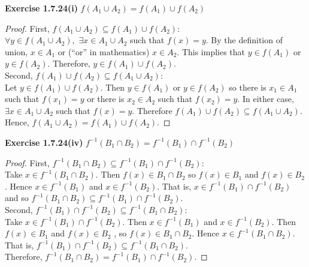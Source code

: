 \documentclass[12pt]{article}
\theoremstyle{definition}
\numberwithin{equation}{subsection}
\begin{document}
\textbf{Exercise 1.7.24(i)} \(f\left(A_{1} \cup A_{2}\right)=f\left(A_{1}\right) \cup f\left(A_{2}\right)\)
\begin{proof} First,
\(f\left(A_{1} \cup A_{2}\right) \subseteq f\left(A_{1}\right) \cup f\left(A_{2}\right)\):\\
\(\forall y \in f\left(A_{1} \cup A_{2}\right),\) \(\exists x \in A_{1} \cup A_{2}\)
such that \(f(x)=y .\) By the definition of union, \(x \in A_{1}\) or (``or'' in mathematics) \(x \in A_{2} .\) This implies that \(y \in f\left(A_{1}\right)\)
or \(y \in f\left(A_{2}\right) .\) Therefore, \(y \in f\left(A_{1}\right) \cup f\left(A_{2}\right) .\)\\
Second, \(f\left(A_{1}\right) \cup f\left(A_{2}\right) \subseteq f\left(A_{1} \cup A_{2}\right)\):\\
Let \(y \in f\left(A_{1}\right) \cup f\left(A_{2}\right) .\) Then \(y \in f\left(A_{1}\right)\) or \(y \in f\left(A_{2}\right)\) so there
is \(x_{1} \in A_{1}\) such that \(f\left(x_{1}\right)=y\) or there is \(x_{2} \in A_{2}\) such that \(f\left(x_{2}\right)=y .\) In either case, \(\exists x \in A_{1} \cup A_{2}\) such that \(f(x)=y .\) Therefore \(f\left(A_{1}\right) \cup f\left(A_{2}\right) \subseteq f\left(A_{1} \cup A_{2}\right)\).\\
Hence, \(f\left(A_{1} \cup A_{2}\right)=f\left(A_{1}\right) \cup f\left(A_{2}\right) .\)
\end{proof}

\textbf{Exercise 1.7.24(iv)} \(f^{-1}\left(B_{1} \cap B_{2}\right)=f^{-1}\left(B_{1}\right) \cap f^{-1}\left(B_{2}\right)\)
\begin{proof}
First, \(f^{-1}\left(B_{1} \cap B_{2}\right) \subseteq f^{-1}\left(B_{1}\right) \cap f^{-1}\left(B_{2}\right)\):\\
Take \(x \in f^{-1}\left(B_{1} \cap B_{2}\right) .\) Then \(f(x) \in B_{1} \cap B_{2}\) so \(f(x) \in B_{1}\) and \(f(x) \in B_{2}\).
Hence \(x \in f^{-1}\left(B_{1}\right)\) and \(x \in f^{-1}\left(B_{2}\right) .\) That is, \(x \in f^{-1}\left(B_{1}\right) \cap f^{-1}\left(B_{2}\right)\) and so
\(f^{-1}\left(B_{1} \cap B_{2}\right) \subseteq f^{-1}\left(B_{1}\right) \cap f^{-1}\left(B_{2}\right)\).\\
Second, \(f^{-1}\left(B_{1}\right) \cap f^{-1}\left(B_{2}\right) \subseteq f^{-1}\left(B_{1} \cap B_{2}\right)\):\\
Take \(x \in f^{-1}\left(B_{1}\right) \cap f^{-1}\left(B_{2}\right) .\) Then \(x \in f^{-1}\left(B_{1}\right)\) and \(x \in f^{-1}\left(B_{2}\right)\). Then \(f(x) \in B_{1}\) and \(f(x) \in B_{2}\) , so \(f(x) \in B_{1} \cap B_{2}\). Hence \(x \in f^{-1}\left(B_{1} \cap B_{2}\right)\). That is, \(f^{-1}\left(B_{1}\right) \cap f^{-1}\left(B_{2}\right) \subseteq f^{-1}\left(B_{1} \cap B_{2}\right)\).\\
Therefore, \(f^{-1}\left(B_{1} \cap B_{2}\right)=f^{-1}\left(B_{1}\right) \cap f^{-1}\left(B_{2}\right)\).
\end{proof}
\end{document}
